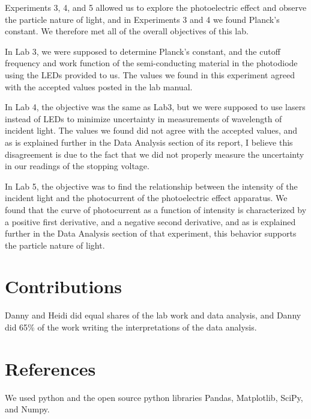 \documentclass[11pt]{article}
\begin{document}
Experiments 3, 4, and 5 allowed us to explore the photoelectric effect
and observe the particle nature of light, and in Experiments 3 and 4 we
found Planck's constant. We therefore met all of the overall objectives
of this lab.

In Lab 3, we were supposed to determine Planck's constant, and the
cutoff frequency and work function of the semi-conducting material in
the photodiode using the LEDs provided to us. The values we found in
this experiment agreed with the accepted values posted in the lab
manual.

In Lab 4, the objective was the same as Lab3, but we were supposed to
use lasers instead of LEDs to minimize uncertainty in measurements of
wavelength of incident light. The values we found did not agree with the
accepted values, and as is explained further in the Data Analysis
section of its report, I believe this disagreement is due to the fact
that we did not properly measure the uncertainty in our readings of the
stopping voltage.

In Lab 5, the objective was to find the relationship between the
intensity of the incident light and the photocurrent of the
photoelectric effect apparatus. We found that the curve of photocurrent
as a function of intensity is characterized by a positive first
derivative, and a negative second derivative, and as is explained
further in the Data Analysis section of that experiment, this behavior
supports the particle nature of light.

    \hypertarget{contributions}{%
\section{Contributions}\label{contributions}}

Danny and Heidi did equal shares of the lab work and data analysis, and
Danny did 65\% of the work writing the interpretations of the data
analysis.

    \hypertarget{references}{%
\section{References}\label{references}}

We used python and the open source python libraries Pandas, Matplotlib,
SciPy, and Numpy.
\end{document}
